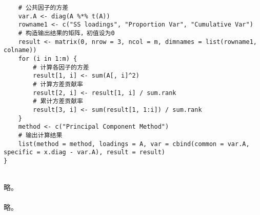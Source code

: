 \begin{enumerate}
\begin{lstlisting}
    # 公共因子的方差
    var.A <- diag(A %*% t(A))
    rowname1 <- c("SS loadings", "Proportion Var", "Cumulative Var")
    # 构造输出结果的矩阵，初值设为0
    result <- matrix(0, nrow = 3, ncol = m, dimnames = list(rowname1, colname))
    for (i in 1:m) {
        # 计算各因子的方差
        result[1, i] <- sum(A[, i]^2)
        # 计算方差贡献率
        result[2, i] <- result[1, i] / sum.rank
        # 累计方差贡献率
        result[3, i] <- sum(result[1, 1:i]) / sum.rank
    }
    method <- c("Principal Component Method")
    # 输出计算结果
    list(method = method, loadings = A, var = cbind(common = var.A, specific = x.diag - var.A), result = result)
}
\end{lstlisting}
        \out\\
        略。\\
        \summary\\
        略。
    \end{enumerate}
\clearpage